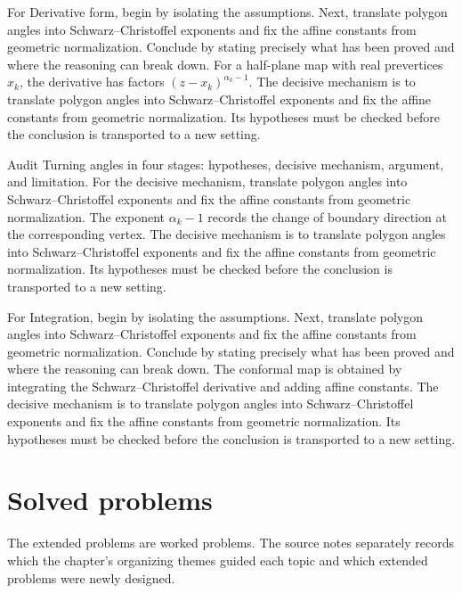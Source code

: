 \begin{example}\label{ex:iv18-worked-02}
For Derivative form, begin by isolating the assumptions. Next, translate polygon angles into Schwarz--Christoffel exponents and fix the affine constants from geometric normalization. Conclude by stating precisely what has been proved and where the reasoning can break down. For a half-plane map with real prevertices $x_k$, the derivative has factors $(z-x_k)^{\alpha_k-1}$. The decisive mechanism is to translate polygon angles into Schwarz--Christoffel exponents and fix the affine constants from geometric normalization. Its hypotheses must be checked before the conclusion is transported to a new setting.
\end{example}

\begin{example}\label{ex:iv18-worked-03}
Audit Turning angles in four stages: hypotheses, decisive mechanism, argument, and limitation. For the decisive mechanism, translate polygon angles into Schwarz--Christoffel exponents and fix the affine constants from geometric normalization. The exponent $\alpha_k-1$ records the change of boundary direction at the corresponding vertex. The decisive mechanism is to translate polygon angles into Schwarz--Christoffel exponents and fix the affine constants from geometric normalization. Its hypotheses must be checked before the conclusion is transported to a new setting.
\end{example}

\begin{example}\label{ex:iv18-worked-04}
For Integration, begin by isolating the assumptions. Next, translate polygon angles into Schwarz--Christoffel exponents and fix the affine constants from geometric normalization. Conclude by stating precisely what has been proved and where the reasoning can break down. The conformal map is obtained by integrating the Schwarz–Christoffel derivative and adding affine constants. The decisive mechanism is to translate polygon angles into Schwarz--Christoffel exponents and fix the affine constants from geometric normalization. Its hypotheses must be checked before the conclusion is transported to a new setting.
\end{example}

\section{Solved problems}
The extended problems are worked problems. The source notes separately records which the chapter's organizing themes guided each topic and which extended problems were newly designed.

